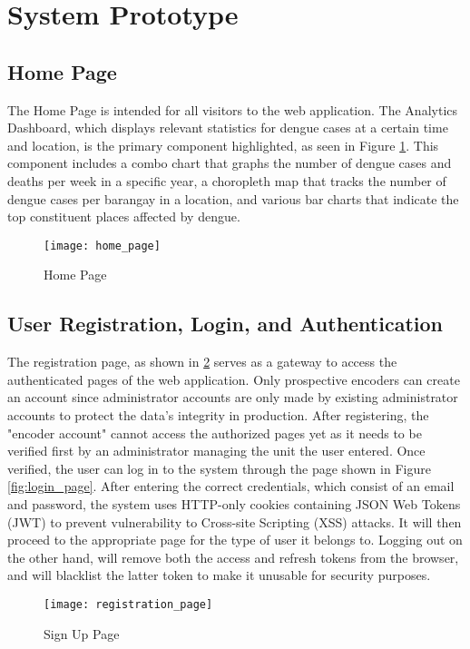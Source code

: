\section{System Prototype}
\subsection{Home Page}
The Home Page is intended for all visitors to the web application. The Analytics Dashboard, which displays relevant statistics for dengue cases at a certain time and location, is the primary component highlighted, as seen in Figure \ref{fig:home_page}. This component includes a combo chart that graphs the number of dengue cases and deaths per week in a specific year, a choropleth map that tracks the number of dengue cases per barangay in a location, and various bar charts that indicate the top constituent places affected by dengue. 
\begin{figure}[H]
	\centering
	\texttt{[image: home\_page]}
	\caption{Home Page}
	\label{fig:home_page}
\end{figure}

\subsection{User Registration, Login, and Authentication}
The registration page, as shown in \ref{fig:registration_page}  serves as a gateway to access the authenticated pages of the web application. Only prospective encoders can create an account since administrator accounts are only made by existing administrator accounts to protect the data's integrity in production. After registering, the "encoder account" cannot access the authorized pages yet as it needs to be verified first by an administrator managing the unit the user entered. Once verified, the user can log in to the system through the page shown in Figure \ref{fig:login_page}. After entering the correct credentials, which consist of an email and password, the system uses HTTP-only cookies containing JSON Web Tokens (JWT) to prevent vulnerability to Cross-site Scripting (XSS) attacks. It will then proceed to the appropriate page for the type of user it belongs to. Logging out on the other hand, will remove both the access and refresh tokens from the browser, and will blacklist the latter token to make it unusable for security purposes. 

\begin{figure}[H]
	\centering
	\texttt{[image: registration\_page]}
	\caption{Sign Up Page}
	\label{fig:registration_page}
\end{figure}

